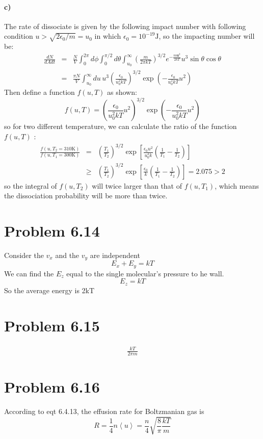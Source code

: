 \documentclass{article}
\begin{document}
\paragraph{c)}
The rate of dissociate is given by the following impact number with following condition $u> \sqrt{2\epsilon_0/m} = u_0$ in which $\epsilon_0 = 10^{-19}\mathrm{J}$, so the impacting number will be:
\begin{eqnarray}
\frac{dN}{dAdt} &=& \frac{N}{V}\int_0^{2\pi}d\phi \int_0^{\pi/2}d\theta \int_{u_0}^\infty \left(\frac{m}{2\pi kT}\right)^{3/2}e^{-\frac{m\mathbf{u}^2}{2kT}}u^3\sin{\theta} \cos{\theta}\nonumber\\
&=&\frac{\pi N}{V}\int_{u_0}^\infty du\,u^3\left(\frac{\epsilon_0}{u_0^2 kT}\right)^{3/2}\exp{\left(-\frac{\epsilon_0}{u_0^2 kT}u^2\right)}
\end{eqnarray}
Then define a function $f(u,T)$ as shown:
$$
f(u,T) = \left(\frac{\epsilon_0}{u_0^2 kT}u^2\right)^{3/2}\exp{\left(-\frac{\epsilon_0}{u_0^2 kT}u^2\right)}
$$
so for two different temperature, we can calculate the ratio of the function $f(u,T)$ :
\begin{eqnarray}
\frac{f(u,T_2 = 310\mathrm{K})}{f(u,T_1 = 300\mathrm{K})}& =& \left(\frac{T_1}{T_2}\right)^{3/2}\exp\left[\frac{\epsilon_0 u^2}{u_0^2k}\left(\frac{1}{T_1}-\frac{1}{T_2}\right)\right]\nonumber\\
&\geq&\left(\frac{T_1}{T_2}\right)^{3/2}\exp\left[\frac{\epsilon_0}{k}\left(\frac{1}{T_1}-\frac{1}{T_2}\right)\right]=2.075> 2
\end{eqnarray}
so the integral of $f(u,T_2)$ will twice larger than that of $f(u,T_1)$, which means the dissociation probability will be more than twice.


\section*{Problem 6.14}
Consider the $v_x$ and the $v_y$ are independent 
$$E_x+E_y=kT$$
We can find the $E_z$ equal to the single molecular's pressure to he wall.
$$E_z=kT$$ 
So the average energy is 2kT

\section*{Problem 6.15}
	\begin{align}
	\frac{kT}{2\pi m}
	\end{align}

\section*{Problem 6.16} %
\label{sec:problem_6_16}
	According to eqt 6.4.13, the effusion rate for Boltzmanian gas is
	\begin{equation}
		R=\frac{1}{4}n\left< u \right>= \frac{n}{4}\sqrt{\frac{8}{\pi} \frac{kT}{m}}
	\end{equation}
\end{document}
